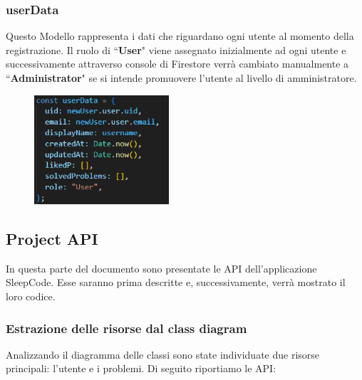 \documentclass[11pt, a4paper]{article}
\theoremstyle{definition}
\begin{document}
\subsubsection*{userData}
Questo Modello rappresenta i dati che riguardano ogni utente al momento della registrazione. Il ruolo di ``\textbf{User}" viene assegnato inizialmente ad ogni utente e successivamente attraverso console di Firestore verrà cambiato manualmente a ``\textbf{Administrator}"
se si intende promuovere l'utente al livello di amministratore.

\begin{figure}[H]
  \centering
  \includegraphics[width=5cm]{materiale/User Template.png}
\end{figure}

\newpage
\subsection{Project API}
In questa parte del documento sono presentate le API dell'applicazione SleepCode.
Esse saranno prima descritte e, successivamente, verrà mostrato il loro codice.

\subsubsection{Estrazione delle risorse dal class diagram}
Analizzando il diagramma delle classi sono state individuate due risorse principali: l'utente e i problemi. Di seguito riportiamo le API:
\end{document}
